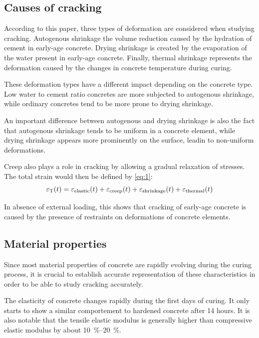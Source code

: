 \documentclass{report}
\begin{document}
\subsection{Causes of cracking}
According to this paper, three types of deformation are considered when
studying cracking. Autogenous shrinkage the volume reduction
caused by the hydration of cement in early-age concrete. Drying shrinkage is
created by the evaporation of the water present in early-age concrete. Finally,
thermal shrinkage represents the deformation caused by the changes in concrete
temperature during curing.

These deformation types have a different impact depending on the concrete type.
Low water to cement ratio concretes are more subjected to autogenous shrinkage, while
ordinary concretes tend to be more prone to drying shrinkage.

An important difference between autogenous and drying shrinkage is also the
fact that autogenous shrinkage tends to be uniform in a concrete element, while
drying shrinkage appears more prominently on the surface, leadin to non-uniform
deformations.

Creep also plays a role in cracking by allowing a gradual relaxation of
stresses. The total strain would then be defined by \autoref{eq:1}:
\begin{equation}
  \epsilon_{\text T}(t) =
  \epsilon_{\text{elastic}}(t) +
  \epsilon_{\text{creep}}(t) +
  \epsilon_{\text{shrinkage}}(t) +
  \epsilon_{\text{thermal}}(t)
  \label{eq:1}
\end{equation}

In absence of external loading, this shows that cracking of early-age concrete
is caused by the presence of restraints on deformations of concrete elements.

\subsection{Material properties}
Since most material properties of concrete are rapidly evolving during the
curing process, it is crucial to establish accurate representation of these
characteristics in order to be able to study cracking accurately.

The elasticity of concrete changes rapidly during the first days of curing. It
only starts to show a similar comportement to hardened concrete after 14 hours.
It is also notable that the tensile elastic modulus is generally higher than
compressive elastic modulus by about \SIrange{10}{20}\percent.
\end{document}
